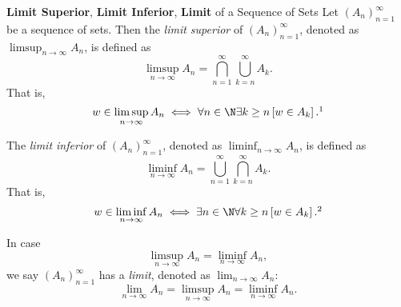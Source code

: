 \documentclass[stat901]{subfiles}
\begin{document}
    \begin{recall}{\textbf{Limit Superior}, \textbf{Limit Inferior}, \textbf{Limit} of a Sequence of Sets}
        Let $\left( A_{n} \right)^{\infty}_{n=1}$ be a sequence of sets. Then the \emph{limit superior} of $\left( A_{n} \right)^{\infty}_{n=1}$, denoted as $\limsup_{n\to\infty} A_n$, is defined as
        \begin{equation*}
            \limsup_{n\to\infty} A_n = \bigcap^{\infty}_{n=1}\bigcup^{\infty}_{k=n} A_k.
        \end{equation*}
        That is,
        \begin{equation*}
            w\in\limsup_{n\to\infty} A_n \iff \forall n\in\N\exists k\geq n \left[ w\in A_k \right].\footnotemark[1]
        \end{equation*}
        
        The \emph{limit inferior} of $\left( A_{n} \right)^{\infty}_{n=1}$, denoted as $\liminf_{n\to\infty}A_n$, is defined as
        \begin{equation*}
            \liminf_{n\to\infty} A_n = \bigcup^{\infty}_{n=1}\bigcap^{\infty}_{k=n} A_k.
        \end{equation*}
        That is,
        \begin{equation*}
            w\in\liminf_{n\to\infty}A_n \iff \exists n\in\N\forall k\geq n\left[ w\in A_k \right].\footnotemark[2]
        \end{equation*}

        In case
        \begin{equation*}
            \limsup_{n\to\infty} A_n = \liminf_{n\to\infty} A_n,
        \end{equation*}
        we say $\left( A_{n} \right)^{\infty}_{n=1}$ has a \emph{limit}, denoted as $\lim_{n\to\infty}A_n$:
        \begin{equation*}
            \lim_{n\to\infty} A_n = \limsup_{n\to\infty} A_n = \liminf_{n\to\infty} A_n.
        \end{equation*}
        
        \noindent
        \begin{minipage}{\textwidth}
        \end{minipage}
    \end{recall}
    
\end{document}
